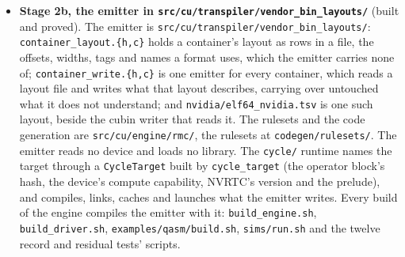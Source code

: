 \begin{enumerate}
\begin{itemize}
\begin{enumerate}
\begin{itemize}
\begin{itemize}
\end{itemize}
\item \textbf{Stage 2b, the emitter in \texttt{src/\allowbreak{}cu/\allowbreak{}transpiler/\allowbreak{}vendor\_\allowbreak{}bin\_\allowbreak{}layouts/\allowbreak{}}} (built and proved). The emitter is \texttt{src/\allowbreak{}cu/\allowbreak{}transpiler/\allowbreak{}vendor\_\allowbreak{}bin\_\allowbreak{}layouts/\allowbreak{}}: \texttt{container\_\allowbreak{}layout.\allowbreak{}\{h,c\}} holds a container's layout as rows in a file, the offsets, widths, tags and names a format uses, which the emitter carries none of; \texttt{container\_\allowbreak{}write.\allowbreak{}\{h,c\}} is one emitter for every container, which reads a layout file and writes what that layout describes, carrying over untouched what it does not understand; and \texttt{nvidia/\allowbreak{}elf64\_\allowbreak{}nvidia.\allowbreak{}tsv} is one such layout, beside the cubin writer that reads it. The rulesets and the code generation are \texttt{src/\allowbreak{}cu/\allowbreak{}engine/\allowbreak{}rmc/\allowbreak{}}, the rulesets at \texttt{codegen/\allowbreak{}rulesets/\allowbreak{}}. The emitter reads no device and loads no library. The \texttt{cycle/\allowbreak{}} runtime names the target through a \texttt{Cycle\allowbreak{}Target} built by \texttt{cycle\_\allowbreak{}target} (the operator block's hash, the device's compute capability, NVRTC's version and the prelude), and compiles, links, caches and launches what the emitter writes. Every build of the engine compiles the emitter with it: \texttt{build\_\allowbreak{}engine.\allowbreak{}sh}, \texttt{build\_\allowbreak{}driver.\allowbreak{}sh}, \texttt{examples/\allowbreak{}qasm/\allowbreak{}build.\allowbreak{}sh}, \texttt{sims/\allowbreak{}run.\allowbreak{}sh} and the twelve record and residual tests' scripts.


\end{itemize}
\end{enumerate}
\end{itemize}
\end{enumerate}
